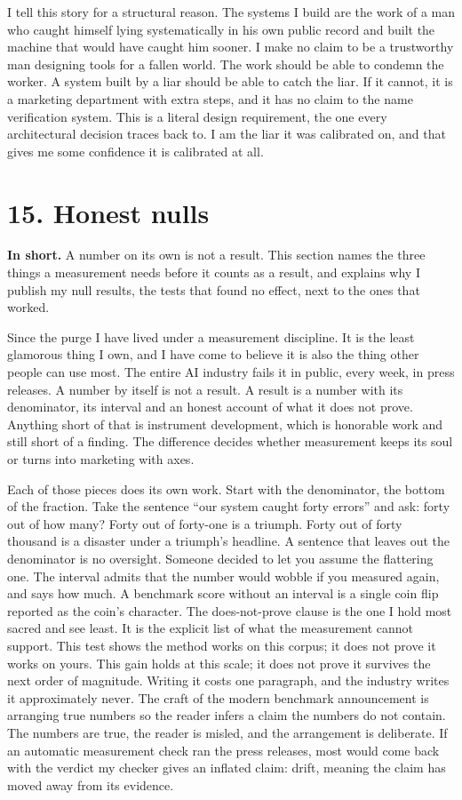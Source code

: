 \documentclass[11pt]{article}
\begin{document}
I tell this story for a structural reason. The systems I build are the work of a man who caught himself lying systematically in his own public record and built the machine that would have caught him sooner. I make no claim to be a trustworthy man designing tools for a fallen world. The work should be able to condemn the worker. A system built by a liar should be able to catch the liar. If it cannot, it is a marketing department with extra steps, and it has no claim to the name verification system. This is a literal design requirement, the one every architectural decision traces back to. I am the liar it was calibrated on, and that gives me some confidence it is calibrated at all.

\section*{15. Honest nulls}

\textbf{In short.} A number on its own is not a result. This section names the three things a measurement needs before it counts as a result, and explains why I publish my null results, the tests that found no effect, next to the ones that worked.

Since the purge I have lived under a measurement discipline. It is the least glamorous thing I own, and I have come to believe it is also the thing other people can use most. The entire AI industry fails it in public, every week, in press releases. A number by itself is not a result. A result is a number with its denominator, its interval and an honest account of what it does not prove. Anything short of that is instrument development, which is honorable work and still short of a finding. The difference decides whether measurement keeps its soul or turns into marketing with axes.

Each of those pieces does its own work. Start with the denominator, the bottom of the fraction. Take the sentence ``our system caught forty errors'' and ask: forty out of how many? Forty out of forty-one is a triumph. Forty out of forty thousand is a disaster under a triumph's headline. A sentence that leaves out the denominator is no oversight. Someone decided to let you assume the flattering one. The interval admits that the number would wobble if you measured again, and says how much. A benchmark score without an interval is a single coin flip reported as the coin's character. The does-not-prove clause is the one I hold most sacred and see least. It is the explicit list of what the measurement cannot support. This test shows the method works on this corpus; it does not prove it works on yours. This gain holds at this scale; it does not prove it survives the next order of magnitude. Writing it costs one paragraph, and the industry writes it approximately never. The craft of the modern benchmark announcement is arranging true numbers so the reader infers a claim the numbers do not contain. The numbers are true, the reader is misled, and the arrangement is deliberate. If an automatic measurement check ran the press releases, most would come back with the verdict my checker gives an inflated claim: drift, meaning the claim has moved away from its evidence.
\end{document}
